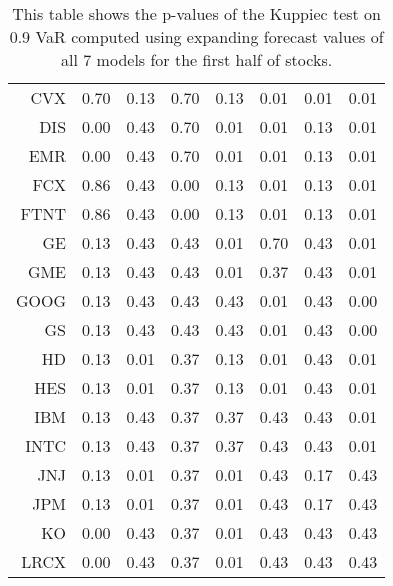 \begin{table}[ht]
\begin{tabular}{rrrrrrrr}
  CVX & 0.70 & 0.13 & 0.70 & 0.13 & 0.01 & 0.01 & 0.01 \\ 
  DIS & 0.00 & 0.43 & 0.70 & 0.01 & 0.01 & 0.13 & 0.01 \\ 
  EMR & 0.00 & 0.43 & 0.70 & 0.01 & 0.01 & 0.13 & 0.01 \\ 
  FCX & 0.86 & 0.43 & 0.00 & 0.13 & 0.01 & 0.13 & 0.01 \\ 
  FTNT & 0.86 & 0.43 & 0.00 & 0.13 & 0.01 & 0.13 & 0.01 \\ 
  GE & 0.13 & 0.43 & 0.43 & 0.01 & 0.70 & 0.43 & 0.01 \\ 
  GME & 0.13 & 0.43 & 0.43 & 0.01 & 0.37 & 0.43 & 0.01 \\ 
  GOOG & 0.13 & 0.43 & 0.43 & 0.43 & 0.01 & 0.43 & 0.00 \\ 
  GS & 0.13 & 0.43 & 0.43 & 0.43 & 0.01 & 0.43 & 0.00 \\ 
  HD & 0.13 & 0.01 & 0.37 & 0.13 & 0.01 & 0.43 & 0.01 \\ 
  HES & 0.13 & 0.01 & 0.37 & 0.13 & 0.01 & 0.43 & 0.01 \\ 
  IBM & 0.13 & 0.43 & 0.37 & 0.37 & 0.43 & 0.43 & 0.01 \\ 
  INTC & 0.13 & 0.43 & 0.37 & 0.37 & 0.43 & 0.43 & 0.01 \\ 
  JNJ & 0.13 & 0.01 & 0.37 & 0.01 & 0.43 & 0.17 & 0.43 \\ 
  JPM & 0.13 & 0.01 & 0.37 & 0.01 & 0.43 & 0.17 & 0.43 \\ 
  KO & 0.00 & 0.43 & 0.37 & 0.01 & 0.43 & 0.43 & 0.43 \\ 
  LRCX & 0.00 & 0.43 & 0.37 & 0.01 & 0.43 & 0.43 & 0.43 \\ 
   \hline
\end{tabular}
\caption[Kupiec test p-values, alpha =0.9 (1)]{This table shows the p-values of the Kuppiec test on 0.9 VaR computed using expanding forecast values of all 7 models for the first half of stocks.} 
\label{Table:Kupiec_test_expanding_0.9_1}
\end{table}
